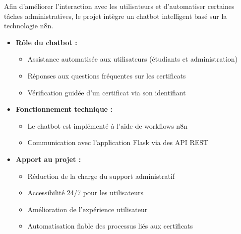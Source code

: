 \documentclass{article}
\begin{document}
Afin d’améliorer l’interaction avec les utilisateurs et d’automatiser certaines tâches administratives, le projet intègre un chatbot intelligent basé sur la technologie n8n.

\begin{itemize}
    \item \textbf{Rôle du chatbot :}
    \begin{itemize}
        \item Assistance automatisée aux utilisateurs (étudiants et administration)
        \item Réponses aux questions fréquentes sur les certificats
        \item Vérification guidée d’un certificat via son identifiant
    \end{itemize}

    \item \textbf{Fonctionnement technique :}
    \begin{itemize}
        \item Le chatbot est implémenté à l’aide de workflows n8n
        \item Communication avec l’application Flask via des API REST

    \end{itemize}

    \item \textbf{Apport au projet :}
    \begin{itemize}
        \item Réduction de la charge du support administratif
        \item Accessibilité 24/7 pour les utilisateurs
        \item Amélioration de l’expérience utilisateur
        \item Automatisation fiable des processus liés aux certificats
    \end{itemize}
\end{itemize}
\end{document}
